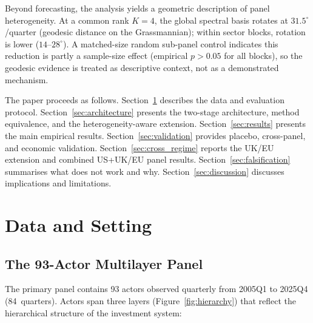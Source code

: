 \documentclass[11pt,a4paper]{article}
\begin{document}
Beyond forecasting, the analysis yields a geometric description of panel heterogeneity. At a common rank $K{=}4$, the global spectral basis rotates at $31.5^\circ$/quarter (geodesic distance on the Grassmannian); within sector blocks, rotation is lower ($14$--$28^\circ$). A matched-size random sub-panel control indicates this reduction is partly a sample-size effect (empirical $p > 0.05$ for all blocks), so the geodesic evidence is treated as descriptive context, not as a demonstrated mechanism.

The paper proceeds as follows. Section~\ref{sec:data} describes the data and evaluation protocol. Section~\ref{sec:architecture} presents the two-stage architecture, method equivalence, and the heterogeneity-aware extension. Section~\ref{sec:results} presents the main empirical results. Section~\ref{sec:validation} provides placebo, cross-panel, and economic validation. Section~\ref{sec:cross_regime} reports the UK/EU extension and combined US+UK/EU panel results. Section~\ref{sec:falsification} summarises what does not work and why. Section~\ref{sec:discussion} discusses implications and limitations.


\section{Data and Setting}
\label{sec:data}

\subsection{The 93-Actor Multilayer Panel}

The primary panel contains 93 actors observed quarterly from 2005Q1 to 2025Q4 (84~quarters). Actors span three layers (Figure~\ref{fig:hierarchy}) that reflect the hierarchical structure of the investment system:
\end{document}
